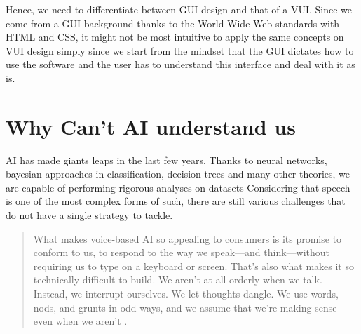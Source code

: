 Hence, we need to differentiate between GUI design and that of a VUI. Since  we come from a GUI background thanks to the World Wide Web standards with HTML and CSS, it might not be most intuitive to apply the same concepts on VUI design simply since we start from the mindset that the GUI dictates how to use the software and the user has to understand this interface and deal with it as is.








\section{Why Can't AI understand us}

AI has made giants leaps in the last few years. Thanks to neural networks, bayesian approaches in classification, decision trees and many other theories, we are capable of performing rigorous analyses on datasets
Considering that speech is one of the most complex forms of such, there are still various challenges that do not have a single strategy to tackle.

\begin{quotation}
What makes voice-based AI so appealing to consumers is its promise to conform to us, to respond to the way we speak—and think—without requiring us to type on a keyboard or screen. That’s also what makes it so technically difficult to build. We aren’t at all orderly when we talk. Instead, we interrupt ourselves. We let thoughts dangle. We use words, nods, and grunts in odd ways, and we assume that we’re making sense even when we aren’t \cite{mit:Alexa}.
\end{quotation}

